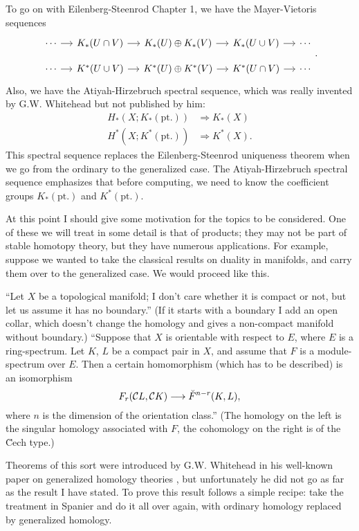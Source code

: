 \documentclass[../main]{subfiles}
\begin{document}
To go on with Eilenberg-Steenrod Chapter 1, we have the Mayer-Vietoris sequences
\[ 
    \begin{tikzcd}[column sep=small, row sep=small]
        \cdots \arrow[r] & K_*(U \cap V) \arrow[r] & K_*(U) \oplus K_*(V) \arrow[r] & K_*(U \cup V) \arrow[r] & \cdots\\
        \cdots \arrow[r] & K^*(U \cup V) \arrow[r] & K^*(U) \oplus K^*(V) \arrow[r] & K^*(U \cap V) \arrow[r] & \cdots
    \end{tikzcd}.
\] 
Also, we have the Atiyah-Hirzebruch spectral sequence, which was really invented by G.W. Whitehead but not published by him:
\begin{align*}
    H_*(X; K_*(\mathrm{pt.})) &\Longrightarrow K_*(X) \\
    H^*(X; K^*(\mathrm{pt.})) &\Longrightarrow K^*(X).
\end{align*}
This spectral sequence replaces the Eilenberg-Steenrod uniqueness theorem when we go from the ordinary to the generalized case. The Atiyah-Hirzebruch spectral sequence emphasizes that before computing, we need to know the coefficient groups $K_*(\mathrm{pt.})$ and $K^*(\mathrm{pt.})$.

At this point I should give some motivation for the topics to be considered. One of these we will treat in some detail is that of products; they may not be part of stable homotopy theory, but they have numerous applications. For example, suppose we wanted to take the classical results on duality in manifolds, and carry them over to the generalized case. We would proceed like this.

``Let $X$ be a topological manifold; I don't care whether it is compact or not, but let us assume it has no boundary.'' (If it starts with a boundary I add an open collar, which doesn't change the homology and gives a non-compact manifold without boundary.) ``Suppose that $X$ is orientable with respect to $E$, where $E$ is a ring-spectrum. Let $K$, $L$ be a compact pair in $X$, and assume that $F$ is a module-spectrum over $E$. Then a certain homomorphism (which has to be described) is an isomorphism
\[ F_r(\mathcal C L, \mathcal C K) \lra \Breve{F}^{n - r}(K, L), \]
where $n$ is the dimension of the orientation class.'' (The homology on the left is the singular homology associated with $F$, the cohomology on the right is of the \u Cech type.)

Theorems of this sort were introduced by G.W. Whitehead in his well-known paper on generalized homology theories \cite{whitehead2}, but unfortunately he did not go as far as the result I have stated. To prove this result follows a simple recipe: take the treatment in Spanier and do it all over again, with ordinary homology replaced by generalized homology.
\end{document}
